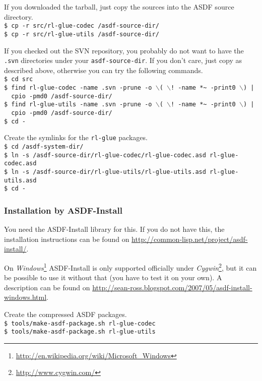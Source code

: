 \documentclass[11pt,a4paper,dvipdfm]{article}
\newcommand{\selfref}[1]{\href{#1}{#1}}
\newcommand{\footref}[2]{\textsl{#1}\footnote{\selfref{#2}}}
\newcommand{\prompttext}[1]{\texttt{#1}}
\newcommand{\shprompt}[1]{\prompttext{\$ #1}}
\begin{document}
If you downloaded the tarball, just copy the sources into the ASDF source
directory. \\
\shprompt{cp -r src/rl-glue-codec /asdf-source-dir/} \\
\shprompt{cp -r src/rl-glue-utils /asdf-source-dir/}

If you checked out the SVN repository, you probably do not want to have the
\prompttext{.svn} directories under your \prompttext{asdf-source-dir}.
If you don't care, just copy as described above, otherwise you can try the
following commands. \\
\shprompt{cd src} \\
\shprompt{find rl-glue-codec -name .svn -prune
          -o $\backslash$( $\backslash$!~-name *\~{} -print0 $\backslash$) | \\
\mbox{~~}cpio -pmd0 /asdf-source-dir/} \\
\shprompt{find rl-glue-utils -name .svn -prune
          -o $\backslash$( $\backslash$!~-name *\~{} -print0 $\backslash$) | \\
\mbox{~~}cpio -pmd0 /asdf-source-dir/} \\
\shprompt{cd -}

Create the symlinks for the \prompttext{rl-glue} packages. \\
\shprompt{cd /asdf-system-dir/} \\
\shprompt{ln -s /asdf-source-dir/rl-glue-codec/rl-glue-codec.asd
          rl-glue-codec.asd} \\
\shprompt{ln -s /asdf-source-dir/rl-glue-utils/rl-glue-utils.asd
          rl-glue-utils.asd} \\
\shprompt{cd -}

\hypertarget{asdfinst}{\subsubsection{Installation by ASDF-Install}}

You need the ASDF-Install library for this. If you do not have this, the
installation instructions can be found on
\selfref{http://common-lisp.net/project/asdf-install/}.

On \footref{Windows}{http://en.wikipedia.org/wiki/Microsoft\_Windows}
ASDF-Install is only supported officially under
\footref{Cygwin}{http://www.cygwin.com/}, but it can be possible to use it
without that (you have to test it on your own). A description can be found on
\selfref{http://sean-ross.blogspot.com/2007/05/asdf-install-windows.html}.

Create the compressed ASDF packages. \\
\shprompt{tools/make-asdf-package.sh rl-glue-codec} \\
\shprompt{tools/make-asdf-package.sh rl-glue-utils}
\end{document}
